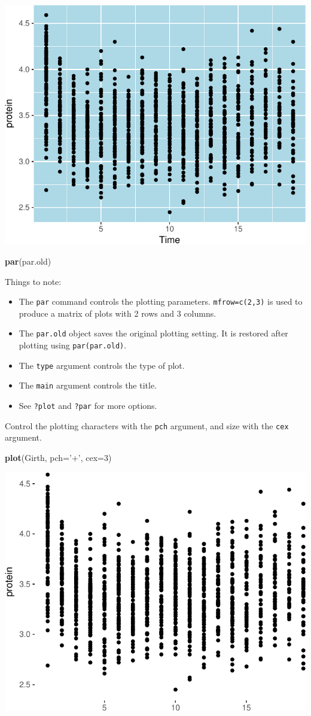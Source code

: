 \documentclass[]{book}
\newenvironment{Shaded}{\begin{snugshade}}{\end{snugshade}}
\newcommand{\DataTypeTok}[1]{\textcolor[rgb]{0.13,0.29,0.53}{#1}}
\newcommand{\DecValTok}[1]{\textcolor[rgb]{0.00,0.00,0.81}{#1}}
\newcommand{\KeywordTok}[1]{\textcolor[rgb]{0.13,0.29,0.53}{\textbf{#1}}}
\newcommand{\NormalTok}[1]{#1}
\newcommand{\StringTok}[1]{\textcolor[rgb]{0.31,0.60,0.02}{#1}}
\providecommand{\tightlist}{%
  \setlength{\itemsep}{0pt}\setlength{\parskip}{0pt}}
\theoremstyle{definition}
\theoremstyle{definition}
\theoremstyle{definition}
\theoremstyle{remark}
\begin{document}
\includegraphics[width=0.5\linewidth]{Rcourse_files/figure-latex/unnamed-chunk-247-1}

\begin{Shaded}
\begin{Highlighting}[]
\KeywordTok{par}\NormalTok{(par.old)}
\end{Highlighting}
\end{Shaded}

Things to note:

\begin{itemize}
\tightlist
\item
  The \texttt{par} command controls the plotting parameters. \texttt{mfrow=c(2,3)} is used to produce a matrix of plots with 2 rows and 3 columns.
\item
  The \texttt{par.old} object saves the original plotting setting. It is restored after plotting using \texttt{par(par.old)}.
\item
  The \texttt{type} argument controls the type of plot.
\item
  The \texttt{main} argument controls the title.
\item
  See \texttt{?plot} and \texttt{?par} for more options.
\end{itemize}

Control the plotting characters with the \texttt{pch} argument, and size with the \texttt{cex} argument.

\begin{Shaded}
\begin{Highlighting}[]
\KeywordTok{plot}\NormalTok{(Girth, }\DataTypeTok{pch=}\StringTok{'+'}\NormalTok{, }\DataTypeTok{cex=}\DecValTok{3}\NormalTok{)}
\end{Highlighting}
\end{Shaded}

\includegraphics[width=0.5\linewidth]{Rcourse_files/figure-latex/unnamed-chunk-248-1}
\end{document}
